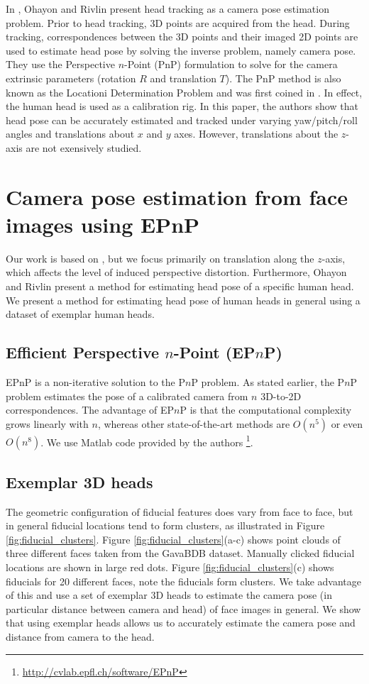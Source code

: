 \documentclass[runningheads]{llncs}
\begin{document}
In \cite{ohayon2006robust}, Ohayon and Rivlin present head tracking as a camera pose estimation problem.  
Prior to head tracking, 3D points are acquired from the head.  
During tracking, correspondences between the 3D points and their imaged 2D points are used to estimate head pose by solving the inverse problem, namely camera pose. 
They use the Perspective $n$-Point (PnP) formulation to solve for the camera extrinsic parameters (rotation $R$ and translation $T$).  
The PnP method is also known as the Locationi Determination Problem and was first coined in \cite{ransac}.  
In effect, the human head is used as a calibration rig.  
In this paper, the authors show that head pose can be accurately estimated and tracked under varying yaw/pitch/roll angles and translations about $x$ and $y$ axes. 
However, translations about the $z$-axis are not exensively studied.  

\section{Camera pose estimation from face images using EPnP}

Our work is based on \cite{ohayon2006robust}, but we focus primarily on translation along the $z$-axis, which affects the level of induced perspective distortion.  
Furthermore, Ohayon and Rivlin present a method for estimating head pose of a specific human head.  
We present a method for estimating head pose of human heads in general using a dataset of exemplar human heads. 

\subsection{Efficient Perspective $n$-Point (EP$n$P)}
EPnP is a non-iterative solution to the P$n$P problem.  
As stated earlier, the P$n$P problem estimates the pose of a calibrated camera from $n$ 3D-to-2D correspondences.  
The advantage of EP$n$P is that the computational complexity grows linearly with $n$, whereas other state-of-the-art methods are $O(n^5)$ or even $O(n^8)$.  
We use Matlab code provided by the authors \footnote{\url{http://cvlab.epfl.ch/software/EPnP}}.

\subsection{Exemplar 3D heads}
The geometric configuration of fiducial features does vary from face to face, but in general fiducial locations tend to form clusters, as illustrated in Figure \ref{fig:fiducial_clusters}.  
Figure \ref{fig:fiducial_clusters}(a-c) shows point clouds of three different faces taken from the GavaBDB \cite{moreno2004gavabdb} dataset. 
Manually clicked fiducial locations are shown in large red dots. 
Figure \ref{fig:fiducial_clusters}(c) shows fiducials for 20 different faces, note the fiducials form clusters.  
We take advantage of this and use a set of exemplar 3D heads to estimate the camera pose (in particular distance between camera and head) of face images in general. 
We show that using exemplar heads allows us to accurately estimate the camera pose and distance from camera to the head.
\end{document}
